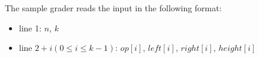 The sample grader reads the input in the following format:
\begin{itemize}
\item line 1: $n$, $k$
\item line $2 + i (0 \le i \le k - 1)$: $op[i]$, $left[i]$, $right[i]$, $height[i]$
\end{itemize}